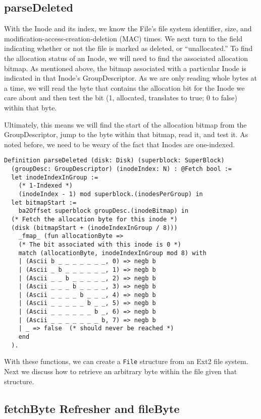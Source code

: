 \documentclass[nocopyrightspace]{sigplanconf}
\begin{document}
\subsection{parseDeleted}
With the Inode and its index, we know the File's file system identifier, size,
and modification-access-creation-deletion (MAC) times.  We next turn to the
field indicating whether or not the file is marked as deleted, or
``unallocated.'' To find the allocation status of an Inode, we will need to
find the associated allocation bitmap. As mentioned above, the bitmap
associated with a particular Inode is indicated in that Inode's
GroupDescriptor. As we are only reading whole bytes at a time, we will read
the byte that contains the allocation bit for the Inode we care about and then
test the bit (1, allocated, translates to true; 0 to false) within that byte.

Ultimately, this means we will find the start of the allocation bitmap from
the GroupDescriptor, jump to the byte within that bitmap, read it, and test
it. As noted before, we need to be weary of the fact that Inodes are
one-indexed.

\begin{lstlisting}
Definition parseDeleted (disk: Disk) (superblock: SuperBlock)
  (groupDesc: GroupDescriptor) (inodeIndex: N) : @Fetch bool :=
  let inodeIndexInGroup := 
    (* 1-Indexed *)
    (inodeIndex - 1) mod superblock.(inodesPerGroup) in
  let bitmapStart := 
    ba2Offset superblock groupDesc.(inodeBitmap) in
  (* Fetch the allocation byte for this inode *)
  (disk (bitmapStart + (inodeIndexInGroup / 8))) 
    _fmap_ (fun allocationByte =>
    (* The bit associated with this inode is 0 *)
    match (allocationByte, inodeIndexInGroup mod 8) with
    | (Ascii b _ _ _ _ _ _ _, 0) => negb b
    | (Ascii _ b _ _ _ _ _ _, 1) => negb b
    | (Ascii _ _ b _ _ _ _ _, 2) => negb b
    | (Ascii _ _ _ b _ _ _ _, 3) => negb b
    | (Ascii _ _ _ _ b _ _ _, 4) => negb b
    | (Ascii _ _ _ _ _ b _ _, 5) => negb b
    | (Ascii _ _ _ _ _ _ b _, 6) => negb b
    | (Ascii _ _ _ _ _ _ _ b, 7) => negb b
    | _ => false  (* should never be reached *)
    end
  ).
\end{lstlisting}

With these functions, we can create a {\tt File} structure from an Ext2 file
system. Next we discuss how to retrieve an arbitrary byte within the file
given that structure.

\subsection{fetchByte Refresher and fileByte}
\end{document}
